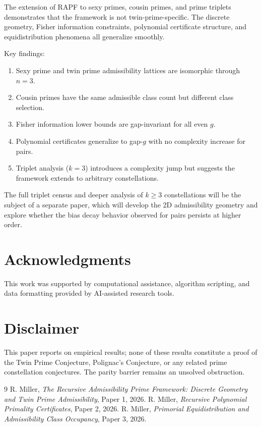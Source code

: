 \documentclass[10pt,a4paper]{article}
\theoremstyle{remark}
\begin{document}
The extension of RAPF to sexy primes, cousin primes, and prime triplets demonstrates
that the framework is not twin-prime-specific. The discrete geometry, Fisher information
constraints, polynomial certificate structure, and equidistribution phenomena all generalize
smoothly.

Key findings:
\begin{enumerate}
    \item Sexy prime and twin prime admissibility lattices are isomorphic through $n = 3$.
    \item Cousin primes have the same admissible class count but different class selection.
    \item Fisher information lower bounds are gap-invariant for all even $g$.
    \item Polynomial certificates generalize to gap-$g$ with no complexity increase for pairs.
    \item Triplet analysis ($k = 3$) introduces a complexity jump but suggests the framework
          extends to arbitrary constellations.
\end{enumerate}

The full triplet census and deeper analysis of $k \geq 3$ constellations will be the
subject of a separate paper, which will develop the 2D admissibility geometry and explore
whether the bias decay behavior observed for pairs persists at higher order.

\section*{Acknowledgments}
This work was supported by computational assistance, algorithm scripting, and data
formatting provided by AI-assisted research tools.

\section*{Disclaimer}
This paper reports on empirical results; none of these results constitute a proof
of the Twin Prime Conjecture, Polignac's Conjecture, or any related prime constellation
conjectures. The parity barrier remains an unsolved obstruction.

\begin{thebibliography}{9}
R. Miller, \emph{The Recursive Admissibility Prime Framework: Discrete Geometry and Twin Prime Admissibility}, Paper 1, 2026.
R. Miller, \emph{Recursive Polynomial Primality Certificates}, Paper 2, 2026.
R. Miller, \emph{Primorial Equidistribution and Admissibility Class Occupancy}, Paper 3, 2026.
\end{thebibliography}
\end{document}
